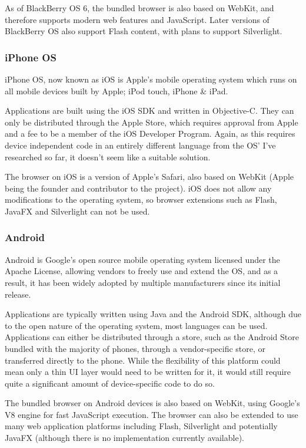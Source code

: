 \documentclass[a4papert,11pt,notitlepage]{ltxdoc}
\begin{document}
As of BlackBerry OS 6, the bundled browser is also based on WebKit\cite{rim:browser}, and therefore supports modern web features and JavaScript. Later versions of BlackBerry OS also support Flash content, with plans to support Silverlight.

\subsubsection{iPhone OS}
iPhone OS, now known as iOS is Apple's mobile operating system which runs on all mobile devices built by Apple; iPod touch, iPhone \& iPad. 

Applications are built using the iOS SDK and written in Objective-C. They can only be distributed through the Apple Store, which requires approval from Apple and a fee to be a member of the iOS Developer Program. Again, as this requires device independent code in an entirely different language from the OS' I've researched so far, it doesn't seem like a suitable solution.

The browser on iOS is a version of Apple's Safari, also based on WebKit (Apple being the founder and contributor to the project). iOS does not allow any modifications to the operating system, so browser extensions such as Flash, JavaFX and Silverlight can not be used.

\subsubsection{Android}
Android is Google's open source mobile operating system licensed under the Apache License, allowing vendors to freely use and extend the OS, and as a result, it has been widely adopted by multiple manufacturers since its initial release.

Applications are typically written using Java and the Android SDK, although due to the open nature of the operating system, most languages can be used. Applications can either be distributed through a store, such as the Android Store bundled with the majority of phones, through a vendor-specific store, or transferred directly to the phone. While the flexibility of this platform could mean only a thin UI layer would need to be written for it, it would still require quite a significant amount of device-specific code to do so.

The bundled browser on Android devices is also based on WebKit, using Google's V8 engine for fast JavaScript execution. The browser can also be extended to use many web application platforms including Flash, Silverlight and potentially JavaFX (although there is no implementation currently available).
\end{document}
